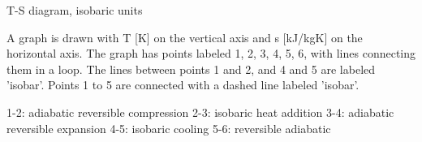 T-S diagram, isobaric units

A graph is drawn with T [K] on the vertical axis and s [kJ/kgK] on the horizontal axis. The graph has points labeled 1, 2, 3, 4, 5, 6, with lines connecting them in a loop. The lines between points 1 and 2, and 4 and 5 are labeled 'isobar'. Points 1 to 5 are connected with a dashed line labeled 'isobar'.

1-2: adiabatic reversible compression  
2-3: isobaric heat addition  
3-4: adiabatic reversible expansion  
4-5: isobaric cooling  
5-6: reversible adiabatic